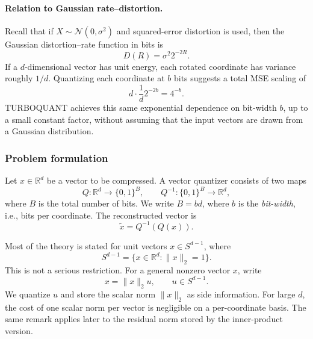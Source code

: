 \paragraph{Relation to Gaussian rate--distortion.}
Recall that if $X\sim \mathcal N(0,\sigma^2)$ and squared-error distortion is used, then the Gaussian distortion--rate function in bits is
\begin{equation}
    D(R)=\sigma^2 2^{-2R}.
\end{equation}
If a $d$-dimensional vector has unit energy, each rotated coordinate has variance roughly $1/d$.
Quantizing each coordinate at $b$ bits suggests a total MSE scaling of
\begin{equation}
    d\cdot \frac1d 2^{-2b}=4^{-b}.
\end{equation}
TURBOQUANT achieves this same exponential dependence on bit-width $b$, up to a small constant factor, without assuming that the input vectors are drawn from a Gaussian distribution.

\subsubsection*{Problem formulation}

Let $x\in \mathbb R^d$ be a vector to be compressed.
A vector quantizer consists of two maps
\begin{equation}
    Q: \mathbb R^d\to \{0,1\}^{B},
    \qquad
    Q^{-1}:\{0,1\}^{B}\to \mathbb R^d,
\end{equation}
where $B$ is the total number of bits.
We write $B=bd$, where $b$ is the \emph{bit-width}, i.e., bits per coordinate.
The reconstructed vector is
\begin{equation}
    \widetilde x = Q^{-1}(Q(x)).
\end{equation}

Most of the theory is stated for unit vectors $x\in S^{d-1}$, where
\begin{equation}
    S^{d-1}=\{x\in \mathbb R^d:\|x\|_2=1\}.
\end{equation}
This is not a serious restriction.
For a general nonzero vector $x$, write
\begin{equation}
    x=\|x\|_2 u,
    \qquad u\in S^{d-1}.
\end{equation}
We quantize $u$ and store the scalar norm $\|x\|_2$ as side information.
For large $d$, the cost of one scalar norm per vector is negligible on a per-coordinate basis.
The same remark applies later to the residual norm stored by the inner-product version.

